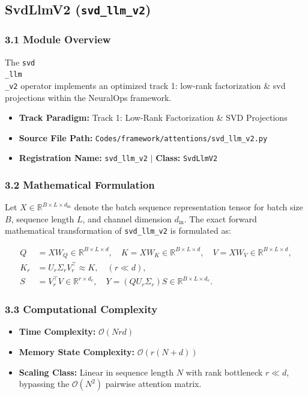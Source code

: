 \subsection{SvdLlmV2 (\texttt{svd\_llm\_v2})}
\label{sec:app_module_svd_llm_v2}

\subsubsection*{3.1 Module Overview}
The \texttt{svd\\_llm\\_v2} operator implements an optimized track 1: low-rank factorization \& svd projections within the NeuralOps framework.
\begin{itemize}
    \item \textbf{Track Paradigm:} Track 1: Low-Rank Factorization & SVD Projections
    \item \textbf{Source File Path:} \texttt{Codes/framework/attentions/svd\_llm\_v2.py}
    \item \textbf{Registration Name:} \texttt{svd\_llm\_v2} $\mid$ \textbf{Class:} \texttt{SvdLlmV2}
\end{itemize}

\subsubsection*{3.2 Mathematical Formulation}
Let $X \in \mathbb{R}^{B \times L \times d_{\text{in}}}$ denote the batch sequence representation tensor for batch size $B$, sequence length $L$, and channel dimension $d_{\text{in}}$. The exact forward mathematical transformation of \texttt{svd\_llm\_v2} is formulated as:

\begin{align}
Q &= X W_Q \in \mathbb{R}^{B \times L \times d}, \quad K = X W_K \in \mathbb{R}^{B \times L \times d}, \quad V = X W_V \in \mathbb{R}^{B \times L \times d}, \\
K_r &= U_r \Sigma_r V_r^\top \approx K, \quad (r \ll d), \\
S &= V_r^\top V \in \mathbb{R}^{r \times d_v}, \quad Y = (Q U_r \Sigma_r) S \in \mathbb{R}^{B \times L \times d_v}.
\end{align}


\subsubsection*{3.3 Computational Complexity}
\begin{itemize}
    \item \textbf{Time Complexity:} $\mathcal{O}(N r d)$
    \item \textbf{Memory State Complexity:} $\mathcal{O}(r(N + d))$
    \item \textbf{Scaling Class:} Linear in sequence length $N$ with rank bottleneck $r \ll d$, bypassing the $\mathcal{O}(N^2)$ pairwise attention matrix.
\end{itemize}

